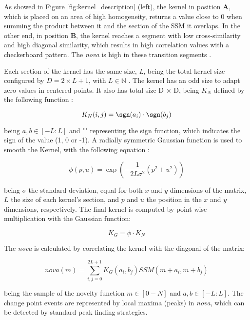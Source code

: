 As showed in Figure \ref{fig:kernel_description} (left), the kernel in position \textbf{A}, which is placed on an area of high homogeneity, returns a value close to $0$ when summing the product between it and the section of the \gls{SSM} it overlaps. In the other end, in position \textbf{B}, the kernel reaches a segment with low cross-similarity and high diagonal similarity, which results in high correlation values with a checkerboard pattern. The \textit{nova} is high in these transition segments \cite{Dannenberg2008, Mueller15_FMP_SPRINGER, MuellerZ19_FMP_ISMIR}.
\par
Each section of the kernel has the same size, \textit{L}, being the total kernel size configured by $D = 2 \times L + 1$, with $L \in \mathbb{N}$ . The kernel has an odd size to adapt zero values in centered points. It also has total size D $\times$ D, being $K_{N}$ defined by the following function \cite{Mueller15_FMP_SPRINGER, MuellerZ19_FMP_ISMIR}:

\begin{equation}
        K_N(i,j)  = \sgn(a_i) \cdot \sgn(b_j)
\end{equation}

being $a, b \in [-L:L]$ and "\sgn" representing the sign function, which indicates the sign of the value (1, 0 or -1). A radially symmetric Gaussian function is used to smooth the Kernel, with the following equation \cite{Mueller15_FMP_SPRINGER, MuellerZ19_FMP_ISMIR}:

\begin{equation}
    \phi(p,u) = \exp(-\frac{1}{2L\sigma^2}(p^2 + u^2))
\end{equation}

being $\sigma$ the standard deviation, equal for both $x$ and $y$ dimensions of the matrix, $L$ the size of each kernel's section, and $p$ and $u$ the position in the $x$ and $y$ dimensions, respectively. The final kernel is computed by point-wise multiplication with the Gaussian function:

\begin{equation}
    K_{G} = \phi \cdot K_{N}    
\end{equation}

The \textit{nova} is calculated by correlating the kernel with the diagonal of the matrix:

\begin{equation}
    nova(m) = \sum^{2L+1}_{i,j=0} K_{G}(a_i,b_j)SSM(m+a_i, m+b_j)
\end{equation}

being the sample of the novelty function $m \in [0-N]$ and $a, b \in [-L:L]$. The change point events are represented by local maxima (peaks) in \textit{nova}, which can be detected by standard peak finding strategies.

